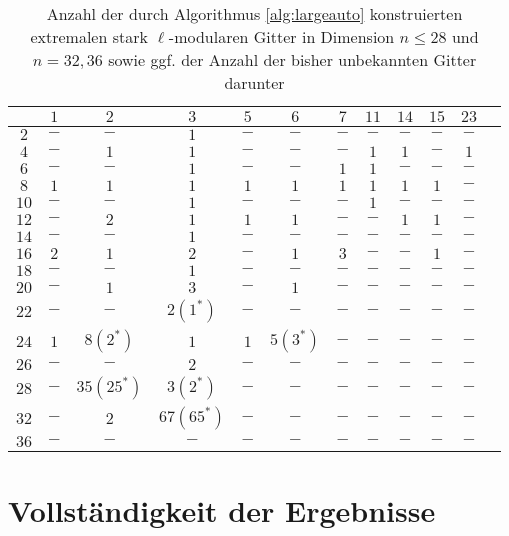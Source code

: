 \documentclass[12pt,a4paper,halfparskip,headsepline,bibtotocnumbered]{scrreprt}
\theoremstyle{nummermitklammern}
\theoremstyle{nonumberbreak}
\begin{document}
\begin{table}[H]\label{tab:numsublat}
	\centering
	\begin{tabular}{|c||c|c|c|c|c|c|c|c|c|c|c|}
		\hline
		\backslashbox{$n$}{$\ell$}	&$1$	&$2$	&$3$	&$5$	&$6$	&$7$	&$11$	&$14$	&$15$	&$23$\\ \hline \hline
		$2$		&$-$		&$-$		&$1$		&$-$		&$-$		&$-$		&$-$		&$-$		&$-$	&$-$\\ \hline
		$4$		&$-$		&$1$		&$1$		&$-$		&$-$		&$-$		&$1$		&$1$		&$-$	&$1$\\ \hline
		$6$		&$-$		&$-$		&$1$		&$-$		&$-$		&$1$		&$1$		&$-$		&$-$	&$-$\\ \hline
		$8$		&$1$		&$1$		&$1$		&$1$		&$1$		&$1$		&$1$		&$1$		&$1$	&$-$\\ \hline
		$10$	&$-$		&$-$		&$1$		&$-$		&$-$		&$-$		&$1$		&$-$		&$-$	&$-$\\ \hline
		$12$	&$-$		&$2$		&$1$		&$1$		&$1$		&$-$		&$-$		&$1$		&$1$	&$-$\\ \hline
		$14$	&$-$		&$-$		&$1$		&$-$		&$-$		&$-$		&$-$		&$-$		&$-$	&$-$\\ \hline
		$16$	&$2$		&$1$		&$2$		&$-$		&$1$		&$3$		&$-$		&$-$		&$1$	&$-$\\ \hline
		$18$	&$-$		&$-$		&$1$		&$-$		&$-$		&$-$		&$-$		&$-$		&$-$	&$-$\\ \hline
		$20$	&$-$		&$1$		&$3$		&$-$		&$1$		&$-$		&$-$		&$-$		&$-$	&$-$\\ \hline
		$22$	&$-$		&$-$		&$2(1^\ast)$&$-$		&$-$		&$-$		&$-$		&$-$		&$-$	&$-$\\ \hline
		$24$	&$1$		&$8(2^\ast)$&$1$		&$1$		&$5(3^\ast)$&$-$		&$-$		&$-$		&$-$	&$-$\\ \hline
		$26$	&$-$		&$-$		&$2$		&$-$		&$-$		&$-$		&$-$		&$-$		&$-$	&$-$\\ \hline
		$28$	&$-$		&$35(25^\ast)$&$3(2^\ast)$&$-$		&$-$		&$-$		&$-$		&$-$		&$-$	&$-$\\ \hline
		$32$	&$-$		&$2$		&$67(65^\ast)$&$-$		&$-$		&$-$		&$-$		&$-$		&$-$	&$-$\\ \hline
		$36$	&$-$		&$-$		&$-$		&$-$		&$-$		&$-$		&$-$		&$-$		&$-$	&$-$\\ \hline
	\end{tabular}
	\caption{Anzahl der durch Algorithmus \eqref{alg:largeauto} konstruierten extremalen stark $\ell$-modularen Gitter in Dimension $n \leq 28$ und $n = 32, 36$ sowie ggf. der Anzahl der bisher unbekannten Gitter darunter}
\end{table}


\section{Vollständigkeit der Ergebnisse}
\end{document}
